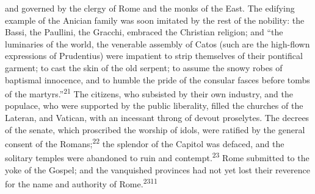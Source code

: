 and governed by the clergy of Rome and the monks of the East. The
edifying example of the Anician family was soon imitated by the
rest of the nobility: the Bassi, the Paullini, the Gracchi,
embraced the Christian religion; and “the luminaries of the
world, the venerable assembly of Catos (such are the high-flown
expressions of Prudentius) were impatient to strip themselves of
their pontifical garment; to cast the skin of the old serpent; to
assume the snowy robes of baptismal innocence, and to humble the
pride of the consular fasces before tombs of the martyrs.”\textsuperscript{21} The
citizens, who subsisted by their own industry, and the populace,
who were supported by the public liberality, filled the churches
of the Lateran, and Vatican, with an incessant throng of devout
proselytes. The decrees of the senate, which proscribed the
worship of idols, were ratified by the general consent of the
Romans;\textsuperscript{22} the splendor of the Capitol was defaced, and the
solitary temples were abandoned to ruin and contempt.\textsuperscript{23} Rome
submitted to the yoke of the Gospel; and the vanquished provinces
had not yet lost their reverence for the name and authority of
Rome.\textsuperscript{2311}



